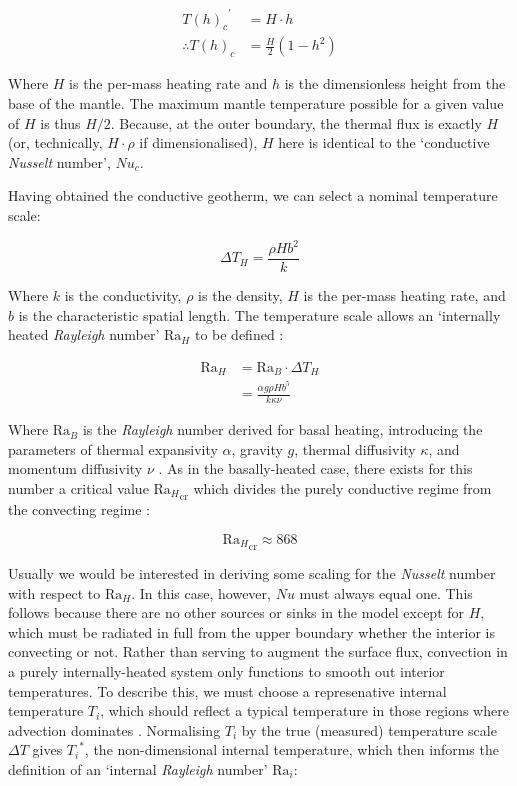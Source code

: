 \begin{align*}
{{T(h)}_{c}}^{'} &= H\cdot h \\
\therefore {T(h)}_{c} &= \frac{H}{2} \left( 1 - h^2 \right)
\end{align*}

Where $H$ is the per-mass heating rate and $h$ is the dimensionless height from the base of the mantle. The maximum mantle temperature possible for a given value of $H$ is thus $H/2$. Because, at the outer boundary, the thermal flux is exactly $H$ (or, technically, $H \cdot \rho$ if dimensionalised), $H$ here is identical to the `conductive \textit{Nusselt} number', ${Nu}_{c}$.

Having obtained the conductive geotherm, we can select a nominal temperature scale:

\begin{equation}
{\Delta T}_H = \frac{\rho H b^2}{k}
\end{equation}

Where $k$ is the conductivity, $\rho$ is the density, $H$ is the per-mass heating rate, and $b$ is the characteristic spatial length. The temperature scale allows an `internally heated \textit{Rayleigh} number' ${\mathrm{Ra}}_H$ to be defined \cite{Roberts1967-aq}:

\begin{align*}
{\mathrm{Ra}}_H &= {\mathrm{Ra}}_B \cdot {\Delta T}_H \\
&= \frac{\alpha g \rho H b^5}{k \kappa \nu}
\end{align*}

Where ${\mathrm{Ra}}_B$ is the \textit{Rayleigh} number derived for basal heating, introducing the parameters of thermal expansivity $\alpha$, gravity $g$, thermal diffusivity $\kappa$, and momentum diffusivity $\nu$ \cite{Turcotte2014-by}. As in the basally-heated case, there exists for this number a critical value ${{\mathrm{Ra}}_{H}}_{\mathrm{cr}}$ which divides the purely conductive regime from the convecting regime \cite{Roberts1967-aq}:

\begin{equation}
{{\mathrm{Ra}}_{H}}_{\mathrm{cr}} \approx 868
\end{equation}

Usually we would be interested in deriving some scaling for the \textit{Nusselt} number with respect to ${\mathrm{Ra}}_H$. In this case, however, $Nu$ must always equal one. This follows because there are no other sources or sinks in the model except for $H$, which must be radiated in full from the upper boundary whether the interior is convecting or not. Rather than serving to augment the surface flux, convection in a purely internally-heated system only functions to smooth out interior temperatures. To describe this, we must choose a represenative internal temperature $T_{i}$, which should reflect a typical temperature in those regions where advection dominates \cite{Solomatov2000-xn}. Normalising $T_{i}$ by the true (measured) temperature scale $\Delta T$ gives ${T_{i}}^{*}$, the non-dimensional internal temperature, which then informs the definition of an `internal \textit{Rayleigh} number' ${\mathrm{Ra}}_i$:

